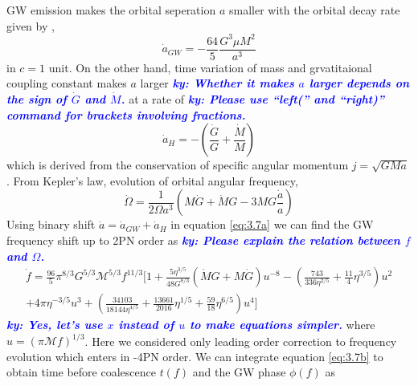 \documentclass[11pt]{article}
\newcommand{\ky}[1]{\textcolor{blue}{\it{\textbf{ky: #1}}} }
\begin{document}
 \hspace*{15.5pt}GW emission makes the orbital seperation $a$ smaller with the orbital decay rate given by \cite{PhysRevD.49.2658},
 \begin{equation}
 \dot{a}_{GW}=-\frac{64}{5}\frac{G^3 \mu M^2}{a^3}
 \end{equation}
 in $c=1$ unit. On the other hand, time variation of mass and grvatitaional coupling constant makes $a$ larger \ky{Whether it makes $a$ larger depends on the sign of $\dot G$ and $\dot M$.} at a rate of \ky{Please use ``left('' and ``right)'' command for brackets involving fractions.} 
 \begin{equation}
 \dot{a}_H=- \left(\frac{\dot{G}}{G}+\frac{\dot{M}}{M} \right)
 \end{equation}
 which is derived from the conservation of specific angular momentum $j=\sqrt{GMa}$. From Kepler's law, evolution of orbital angular frequency,
 \begin{equation}\label{eq:3.7a}
 \dot{\Omega}=\frac{1}{2\Omega a^3}(M\dot{G}+\dot{M}G-3MG\frac{\dot{a}}{a})
 \end{equation}
 \hspace*{15.5pt} Using binary shift $\dot{a}=\dot{a}_{GW}+\dot{a}_H$ in equation \eqref{eq:3.7a} we can find the GW frequency shift up to 2PN order as \ky{Please explain the relation between $f$ and $\Omega$.}
 \begin{align} \label{eq:3.7b}
 \dot{f}=\frac{96}{5}\pi^{8/3}G^{5/3}\mathcal{M}^{5/3}f^{11/3}\bigg[1+\frac{5\eta^{3/5}}{48 G^{8/3}}(\dot{M}G+M\dot{G})u^{-8}-(\frac{743}{336\eta^{2/5}}+\frac{11}{4}\eta^{3/5})u^2 \nonumber \\
 +4\pi\eta^{-3/5}u^3+(\frac{34103}{18144\eta^{4/5}}+\frac{13661}{2016}\eta^{1/5}+\frac{59}{18}\eta^{6/5})u^4\bigg]
 \end{align}
\ky{Yes, let's use $x$ instead of $u$ to make equations simpler.}
where $u=(\pi \mathcal{M}f)^{1/3}$. Here we considered only leading order correction to frequency evolution which enters in -4PN order. We can integrate equation \eqref{eq:3.7b} to obtain time before coalescence $t(f)$ and the GW phase $\phi(f)$ as
\end{document}
